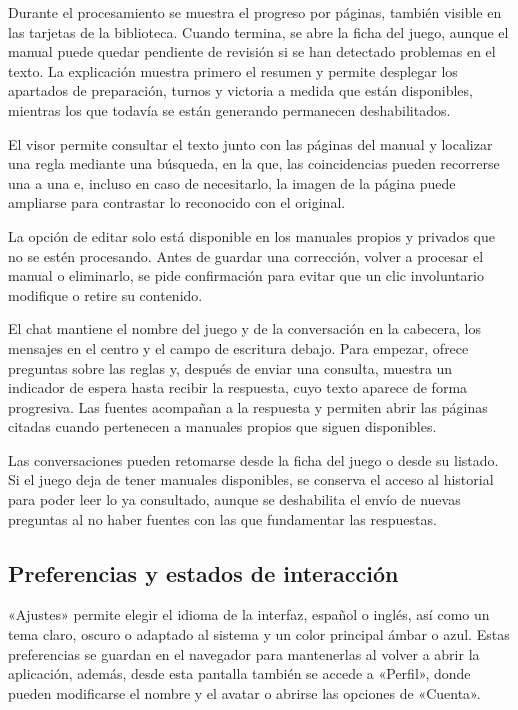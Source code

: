Durante el procesamiento se muestra el progreso por páginas, también
visible en las tarjetas de la biblioteca. Cuando termina, se
abre la ficha del juego, aunque el manual puede quedar pendiente de revisión
si se han detectado problemas en el texto. La explicación muestra primero
el resumen y permite desplegar los apartados de preparación, turnos y
victoria a medida que están disponibles, mientras los que todavía se
están generando permanecen deshabilitados.

El visor permite consultar el texto junto con las páginas del manual y
localizar una regla mediante una búsqueda, en la que, las coincidencias pueden
recorrerse una a una e, incluso en caso de necesitarlo, la imagen de la página puede ampliarse para contrastar
lo reconocido con el original.

La opción de editar solo está disponible en los manuales propios y privados
que no se estén procesando. Antes de guardar una corrección, volver a
procesar el manual o eliminarlo, se pide confirmación para evitar que un
clic involuntario modifique o retire su contenido.

El chat mantiene el nombre del juego y de la conversación en la cabecera,
los mensajes en el centro y el campo de escritura debajo. Para empezar,
ofrece preguntas sobre las reglas y, después de enviar una consulta,
muestra un indicador de espera hasta recibir la respuesta, cuyo texto
aparece de forma progresiva. Las fuentes acompañan a la respuesta y
permiten abrir las páginas citadas cuando pertenecen a manuales propios
que siguen disponibles.

Las conversaciones pueden retomarse desde la ficha del juego o desde su
listado. Si el juego deja de tener manuales disponibles, se conserva el
acceso al historial para poder leer lo ya consultado, aunque se deshabilita
el envío de nuevas preguntas al no haber fuentes con las que fundamentar las respuestas.

\FloatBarrier
\subsection{Preferencias y estados de interacción}

«Ajustes» permite elegir el idioma de la interfaz, español o inglés, así como
un tema claro, oscuro o adaptado al sistema y un color principal ámbar o azul.
Estas preferencias se guardan en el navegador para mantenerlas al volver
a abrir la aplicación, además, desde esta pantalla también se accede a «Perfil»,
donde pueden modificarse el nombre y el avatar o abrirse las opciones de «Cuenta».

